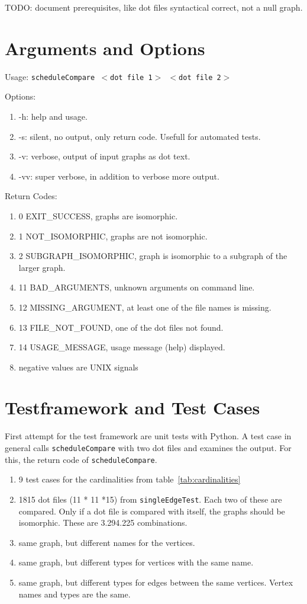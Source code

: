\documentclass[12pt,a4paper]{report}
\begin{document}
TODO: document prerequisites, like dot files syntactical correct, not a null graph.
\chapter{Arguments and Options}
Usage: \texttt{scheduleCompare $<$dot file 1$>$ $<$dot file 2$>$}

Options:
\begin{enumerate}
	\item -h: help and usage.
	\item -s: silent, no output, only return code. Usefull for automated tests.
	\item -v: verbose, output of input graphs as dot text.
	\item -vv: super verbose, in addition to verbose more output.
\end{enumerate}

Return Codes:
\begin{enumerate}
	\item 0 EXIT_SUCCESS, graphs are isomorphic.
	\item 1 NOT_ISOMORPHIC, graphs are not isomorphic.
	\item 2 SUBGRAPH_ISOMORPHIC, graph is isomorphic to a subgraph of the larger graph.
	\item 11 BAD_ARGUMENTS, unknown arguments on command line.
	\item 12 MISSING_ARGUMENT, at least one of the file names is missing.
	\item 13 FILE_NOT_FOUND, one of the dot files not found.
	\item 14 USAGE_MESSAGE, usage message (help) displayed.
	\item negative values are UNIX signals
\end{enumerate}

\chapter{Testframework and Test Cases}
First attempt for the test framework are unit tests with Python. A test case in general calls \texttt{scheduleCompare} with two dot files and examines the output. For this, the return code of \texttt{scheduleCompare}.

\begin{enumerate}
	\item 9 test cases for the cardinalities from table~\ref{tab:cardinalities}
	\item 1815 dot files (11 * 11 *15) from \texttt{singleEdgeTest}. Each two of these are compared. Only if a dot file is compared with itself, the graphs should be isomorphic. These are 3.294.225 combinations.
	\item same graph, but different names for the vertices.
	\item same graph, but different types for vertices with the same name.
	\item same graph, but different types for edges between the same vertices. Vertex names and types are the same.
\end{enumerate}
\end{document}
